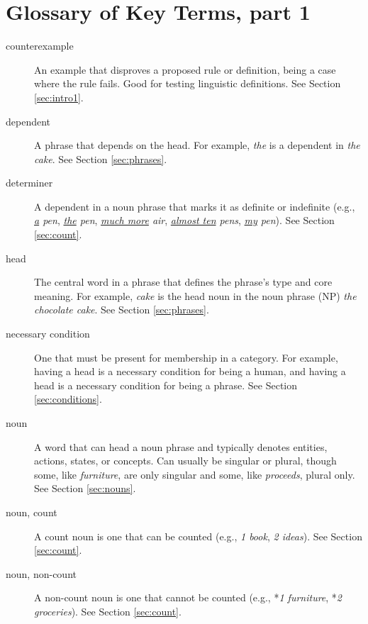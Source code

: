 \newpage
\section{Glossary of Key Terms, part 1}
\begin{description}
   
   \item[counterexample] An example that disproves a proposed rule or definition, being a case where the rule fails. Good for testing linguistic definitions. See Section \ref{sec:intro1}.
   
   \item[dependent] A phrase that depends on the head. For example, \textit{the} is a dependent in \textit{the cake}. See Section \ref{sec:phrases}.
   
   \item[determiner] A dependent in a noun phrase that marks it as definite or indefinite (e.g., \textit{\uline{a} pen}, \textit{\uline{the} pen}, \textit{\uline{much more} air}, \textit{\uline{almost ten} pens}, \textit{\uline{my} pen}). See Section \ref{sec:count}.
   
   \item[head] The central word in a phrase that defines the phrase's type and core meaning. For example, \textit{cake} is the head noun in the noun phrase (NP) \textit{the chocolate cake}.  See Section \ref{sec:phrases}.
   
   \item[necessary condition] One that must be present for membership in a category. For example, having a head is a necessary condition for being a human, and having a head is a necessary condition for being a phrase. See Section \ref{sec:conditions}.
   
   \item[noun] A word that can head a noun phrase and typically denotes entities, actions, states, or concepts. Can usually be singular or plural, though some, like \textit{furniture}, are only singular and some, like \textit{proceeds}, plural only. See Section \ref{sec:nouns}.

       \item[noun, count] A count noun is one that can be counted (e.g., \textit{1 book}, \textit{2 ideas}). See Section \ref{sec:count}.
   
   \item[noun, non-count] A non-count noun is one that cannot be counted (e.g., *\textit{1 furniture}, *\textit{2 groceries}). See Section \ref{sec:count}.
   

\end{description}
